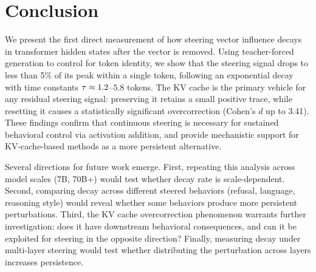 \section{Conclusion}
\label{sec:conclusion}

We present the first direct measurement of how steering vector influence decays in transformer hidden states after the vector is removed. Using teacher-forced generation to control for token identity, we show that the steering signal drops to less than 5\% of its peak within a single token, following an exponential decay with time constants $\tau \approx 1.2$--$5.8$ tokens. The KV cache is the primary vehicle for any residual steering signal: preserving it retains a small positive trace, while resetting it causes a statistically significant overcorrection (Cohen's $d$ up to 3.41). These findings confirm that continuous steering is necessary for sustained behavioral control via activation addition, and provide mechanistic support for KV-cache-based methods as a more persistent alternative.

Several directions for future work emerge. First, repeating this analysis across model scales (7B, 70B+) would test whether decay rate is scale-dependent. Second, comparing decay across different steered behaviors (\eg refusal, language, reasoning style) would reveal whether some behaviors produce more persistent perturbations. Third, the KV cache overcorrection phenomenon warrants further investigation: does it have downstream behavioral consequences, and can it be exploited for steering in the opposite direction? Finally, measuring decay under multi-layer steering would test whether distributing the perturbation across layers increases persistence.
